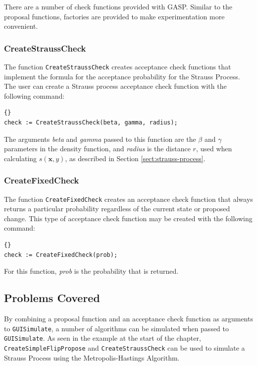 There are a number of check functions provided with GASP.  Similar to
the proposal functions, factories are provided to make experimentation
more convenient.

\subsubsection{CreateStraussCheck}

The function \texttt{CreateStraussCheck} creates acceptance check
functions that implement the formula for the acceptance probability
for the Strauss Process.  The user can create a Strauss process
acceptance check function with the following command:
\begin{lstlisting}{}
check := CreateStraussCheck(beta, gamma, radius);
\end{lstlisting}

\noindent The arguments \emph{beta} and \emph{gamma} passed to this
function are the $\beta$ and $\gamma$ parameters in the density
function, and \emph{radius} is the distance $r$, used when calculating
$s(\mathbf{x}, y)$, as described in Section
\ref{sect:strauss-process}.


\subsubsection{CreateFixedCheck}

The function \texttt{CreateFixedCheck} creates an acceptance check
function that always returns a particular probability regardless of
the current state or proposed change.  This type of acceptance check
function may be created with the following command:
\begin{lstlisting}{}
check := CreateFixedCheck(prob);
\end{lstlisting}
\noindent For this function, \emph{prob} is the probability that is
returned.

\subsection{Problems Covered}

By combining a proposal function and an acceptance check function as
arguments to \texttt{GUISimulate}, a number of algorithms can be
simulated when passed to \texttt{GUISimulate}.  As seen in the example
at the start of the chapter, \texttt{CreateSimpleFlipPropose} and
\texttt{CreateStraussCheck} can be used to simulate a Strauss Process
using the Metropolis-Hastings Algorithm.

